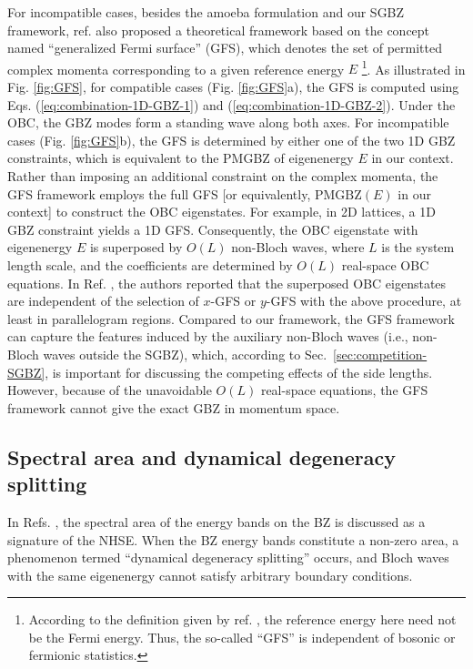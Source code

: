 For incompatible cases, besides the amoeba formulation and our SGBZ
framework, ref. \cite{zhangAlgebraicNonHermitianSkin2025} also proposed
a theoretical framework based on the concept named ``generalized
Fermi surface'' (GFS), which denotes the set of permitted complex
momenta corresponding to a given reference energy $E$ \footnote{According to the definition given by ref. \cite{zhangAlgebraicNonHermitianSkin2025},
the reference energy here need not be the Fermi energy. Thus, the
so-called ``GFS'' is independent of bosonic or fermionic statistics. }. As illustrated in Fig. \ref{fig:GFS}, for compatible cases (Fig.
\ref{fig:GFS}a), the GFS is computed using Eqs. (\ref{eq:combination-1D-GBZ-1})
and (\ref{eq:combination-1D-GBZ-2}). Under the OBC, the GBZ modes
form a standing wave along both axes. For incompatible cases (Fig.
\ref{fig:GFS}b), the GFS is determined by either one of the two 1D
GBZ constraints, which is equivalent to the PMGBZ of eigenenergy $E$
in our context. Rather than imposing an additional constraint on the
complex momenta, the GFS framework employs the full GFS {[}or equivalently,
$\text{PMGBZ}(E)$ in our context{]} to construct the OBC eigenstates.
For example, in 2D lattices, a 1D GBZ constraint yields a 1D GFS.
Consequently, the OBC eigenstate with eigenenergy $E$ is superposed
by $O(L)$ non-Bloch waves, where $L$ is the system length scale,
and the coefficients are determined by $O(L)$ real-space OBC equations.
In Ref. \cite{zhangAlgebraicNonHermitianSkin2025}, the authors reported
that the superposed OBC eigenstates are independent of the selection
of $x$-GFS or $y$-GFS with the above procedure, at least in parallelogram
regions. Compared to our framework, the GFS framework can capture
the features induced by the auxiliary non-Bloch waves (i.e., non-Bloch
waves outside the SGBZ), which, according to Sec.~\ref{sec:competition-SGBZ}, is important
for discussing the competing effects of the side lengths. However,
because of the unavoidable $O(L)$ real-space equations, the GFS framework
cannot give the exact GBZ in momentum space.


\subsection{Spectral area and dynamical degeneracy splitting}

In Refs. \cite{zhangUniversalNonHermitianSkin2022,zhangDynamicalDegeneracySplitting2023},
the spectral area of the energy bands on the BZ is discussed as a
signature of the NHSE. When the BZ energy bands constitute a non-zero
area, a phenomenon termed ``dynamical degeneracy splitting'' occurs,
and Bloch waves with the same eigenenergy cannot satisfy arbitrary
boundary conditions. 

